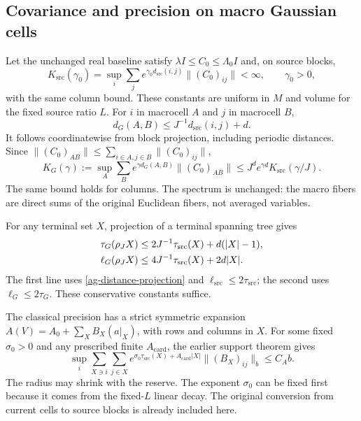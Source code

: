 \documentclass[11pt]{article}
\theoremstyle{remark}
\begin{document}
\subsection{Covariance and precision on macro Gaussian cells}

Let the unchanged real baseline satisfy
$\lambda I\le C_0\le\Lambda_0I$ and, on source blocks,
\begin{equation}\label{ag-source-covariance}
 K_{\mathrm{src}}(\gamma_0)
 =\sup_i\sum_j e^{\gamma_0d_{\mathrm{src}}(i,j)}
                   \|(C_0)_{ij}\|<\infty,
 \qquad \gamma_0>0,
\end{equation}
with the same column bound. These constants are uniform in
$M$ and volume for the fixed source ratio $L$.
For $i$ in macrocell $A$ and $j$ in macrocell $B$,
\begin{equation}\label{ag-distance-projection}
 d_G(A,B)\le J^{-1}d_{\mathrm{src}}(i,j)+d.
\end{equation}
It follows coordinatewise from block projection, including
periodic distances. Since
$\|(C_0)_{AB}\|\le\sum_{i\in A,j\in B}\|(C_0)_{ij}\|$,
\begin{equation}\label{ag-covariance-bound}
 K_G(\gamma):=\sup_A\sum_B e^{\gamma d_G(A,B)}\|(C_0)_{AB}\|
 \le J^d e^{\gamma d}K_{\mathrm{src}}(\gamma/J).
\end{equation}
The same bound holds for columns. The spectrum is unchanged:
the macro fibers are direct sums of the original Euclidean
fibers, not averaged variables.

For any terminal set $X$, projection of a terminal spanning
tree gives
\begin{align}
 \tau_G(\rho_JX)
 &\le 2J^{-1}\tau_{\mathrm{src}}(X)+d(|X|-1),\notag\\
 \ell_G(\rho_JX)
 &\le 4J^{-1}\tau_{\mathrm{src}}(X)+2d|X|.             \label{ag-support-projection}
\end{align}
The first line uses \eqref{ag-distance-projection} and
$\ell_{\mathrm{src}}\le2\tau_{\mathrm{src}}$; the second
uses $\ell_G\le2\tau_G$. These conservative constants suffice.

The classical precision has a strict symmetric expansion
$A(V)=A_0+\sum_X B_X(a|_X)$, with rows and columns in $X$.
For some fixed $\sigma_0>0$ and any prescribed finite
$A_{\mathrm{card}}$, the earlier support theorem gives
\begin{equation}\label{ag-source-precision}
 \sup_i\sum_{X\ni i}\sum_{j\in X}
 e^{\sigma_0\tau_{\mathrm{src}}(X)+A_{\mathrm{card}}|X|}
            \|(B_X)_{ij}\|_b\le C_A b.
\end{equation}
The radius may shrink with the reserve. The exponent
$\sigma_0$ can be fixed first because it comes from the
fixed-$L$ linear decay. The original conversion from current
cells to source blocks is already included here.
\end{document}
